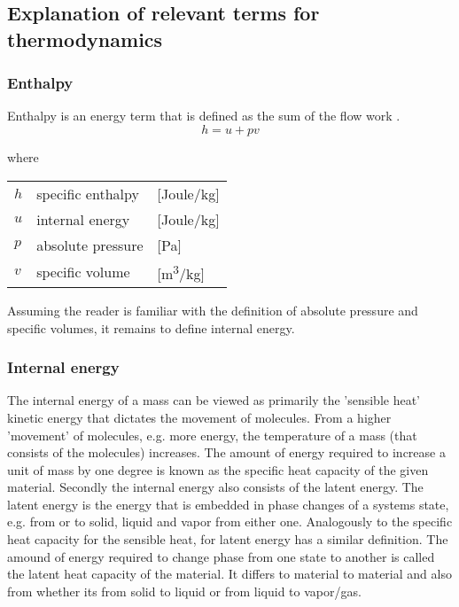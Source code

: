\subsection{Explanation of relevant terms for thermodynamics}
\subsubsection{Enthalpy}
Enthalpy is an energy term that is defined as the sum of the flow work \cite{Koelet1992}.
\begin{equation}
	h = u + pv
\end{equation}

where
	\begin{center}
		\begin{tabular}{l p{3cm} l}

			$h$ & specific enthalpy & [\si{Joule}/\si{kg}]\\
			$u$ & internal energy & [\si{Joule}/\si{kg}]\\
			$p$ & absolute pressure & [\si{Pa}]\\
			$v$ & specific volume & [\si{m^3}/\si{kg}]
		\end{tabular}
	\end{center}

Assuming the reader is familiar with the definition of absolute pressure and specific volumes, it remains to define internal energy.

\subsubsection{Internal energy}
The internal energy of a mass can be viewed as primarily the 'sensible heat' kinetic energy that dictates the movement of molecules. From a higher 'movement' of molecules, e.g. more energy, the temperature of a mass (that consists of the molecules) increases. The amount of energy required to increase a unit of mass by one degree is known as the specific heat capacity of the given material.
Secondly the internal energy also consists of the latent energy. The latent energy is the energy that is embedded in phase changes of a systems state, e.g. from or to solid, liquid and vapor from either one. Analogously to the specific heat capacity for the sensible heat, for latent energy has a similar definition. The amound of energy required to change phase from one state to another is called the latent heat capacity of the material. It differs to material to material and also from whether its from solid to liquid or from liquid to vapor/gas.

